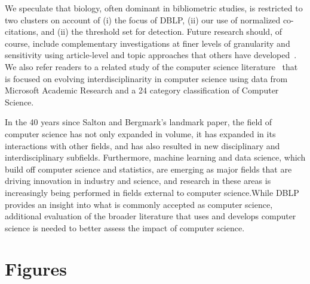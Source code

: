 We speculate that biology, often dominant in bibliometric studies, is restricted to two clusters on account of (i) the focus of DBLP,  (ii) our use of normalized co-citations, and (ii) the threshold set for detection. Future research should, of course, include complementary investigations at finer levels of granularity and sensitivity using article-level and topic approaches that others have developed~\cite{glanzel_using_2017,boyack_clustering_2011,boyack_investigating_2017,boyack_classification_2014,sjogarde_granularity_2019,traag_louvain_2019}. We also refer readers to a related study of the computer science literature~\cite{chakraborty_role_2018} that is focused on evolving interdisciplinarity in computer science using data from Microsoft Academic Research and a 24 category classification of Computer Science.

In the 40 years since Salton and Bergmark's landmark paper, the field of computer science has not only expanded in volume, it has expanded in its interactions with other fields, and has also resulted in new disciplinary and interdisciplinary subfields. Furthermore, machine learning and data science, which build off computer science and statistics, are emerging as major fields that are driving innovation in industry and science, and research in these areas is increasingly being performed in fields external to computer science.While DBLP provides an insight into what is commonly accepted as computer science, additional evaluation of the broader literature that uses and develops computer science is needed to better assess the impact of computer science.

\clearpage

\section*{Figures}


